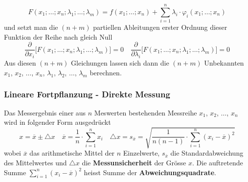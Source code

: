 \begin{equation}
\boxed{F\left(x_1; \dotso; x_n; \lambda_1; \dotso; \lambda_m \right)=f\left(x_1; \dotso; x_n\right)+\displaystyle \sum_{i=1}^n\lambda_i\cdot \varphi_i\left(x_1; \dotso; x_n\right)}
\end{equation}
und setzt man die $\left(n+m\right)$ partiellen Ableitungen erster Ordnung dieser Funktion der Reihe nach gleich Null
\begin{equation}
\boxed{\dfrac{\partial}{\partial x_i}\Big[F\left(x_1; \dotso; x_n; \lambda_1; \dotso; \lambda_m \right)\Big]=0}\quad \boxed{\dfrac{\partial}{\partial \lambda_i}\Big[F\left(x_1; \dotso; x_n; \lambda_1; \dotso; \lambda_m \right)\Big]=0}
\end{equation}
Aus diesen $\left(n+m\right)$ Gleichungen lassen sich dann die $\left(n+m\right)$ Unbekannten $x_1$, $x_2$, $\dotso$, $x_n$, $\lambda_1$, $\lambda_2$, $\dotso$, $\lambda_m$ berechnen. 
\subsubsection{Lineare Fortpflanzung - Direkte Messung}
Das Messergebnis einer aus $n$ Meswerten bestehenden Messreihe $x_1$, $x_2$, $\dotso$, $x_n$ wird in folgender Form ausgedrückt
\begin{equation}
\boxed{x=\overline{x}\pm \triangle x}\quad \boxed{\overline{x}=\dfrac{1}{n}\cdot \displaystyle \sum_{i=1}^nx_i}\quad \boxed{\triangle x=s_{\overline{x}}=\sqrt{\dfrac{1}{n\left(n-1\right)}\cdot \displaystyle \sum_{i=1}^n\left(x_i-\overline{x}\right)^2}}
\end{equation}
wobei $\overline{x}$ das arithmetische Mittel der $n$ Einzelwerte, $s_{\overline{x}}$ die Standardabweichung des Mittelwertes und $\triangle x$ die \textbf{Messunsicherheit} der Grösse $x$. Die auftretende Summe $\displaystyle \sum_{i=1}^n\left(x_i-\overline{x}\right)^2$ heisst Summe der \textbf{Abweichungsquadrate}.
